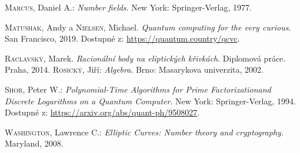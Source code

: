 \documentclass [12pt]{report}
\begin{document}
\begin{thebibliography}{97}


\textsc{Marcus}, Daniel A.: \textit{Number fields}. New York: Springer-Verlag, 1977.

\textsc{Matushak}, Andy a \textsc{Nielsen}, Michael. \textit{ Quantum computing for the very curious}. San Francisco, 2019. Dostupné z: \url{https://quantum.country/qcvc}.

\textsc{Raclavský}, Marek. \textit{Racionální body na eliptických křivkách}. Diplomová práce. Praha, 2014.
\textsc{Rosický}, Jiří: \textit{Algebra}. Brno: Masarykova univerzita, 2002.

\textsc{Shor}, Peter W.: \textit{Polynomial-Time Algorithms for Prime Factorizationand Discrete Logarithms on a Quantum Computer}. New York: Springer-Verlag, 1994. Dostupné z: \url{https://arxiv.org/abs/quant-ph/9508027}.

\textsc{Washington}, Lawrence C.: \textit{Elliptic Curves: Number theory and cryptography}. Maryland, 2008. 

\end{thebibliography}
\end{document}
